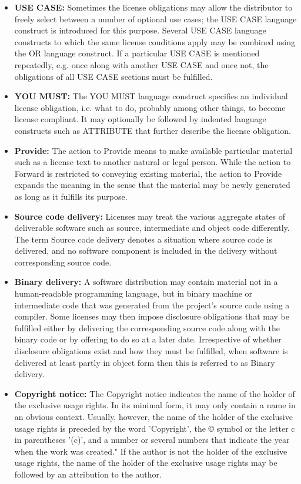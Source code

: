 \begin{itemize}
	\item \textbf{USE CASE:} Sometimes the license obligations may allow the distributor to freely select between a number of optional use cases; the USE CASE language construct is introduced for this purpose. Several USE CASE language constructs to which the same license conditions apply may be combined using the OR language construct. If a particular USE CASE is mentioned repeatedly, e.g. once along with another USE CASE and once not, the obligations of all USE CASE sections must be fulfilled.
	\item \textbf{YOU MUST:} The YOU MUST language construct specifies an individual license obligation, i.e. what to do, probably among other things, to become license compliant. It may optionally be followed by indented language constructs such as ATTRIBUTE that further describe the license obligation.
	\item \textbf{Provide:} The action to Provide means to make available particular material such as a license text to another natural or legal person. While the action to Forward is restricted to conveying existing material, the action to Provide expands the meaning in the sense that the material may be newly generated as long as it fulfills its purpose.
	\item \textbf{Source code delivery:} Licenses may treat the various aggregate states of deliverable software such as source, intermediate and object code differently. The term Source code delivery denotes a situation where source code is delivered, and no software component is included in the delivery without corresponding source code.
	\item \textbf{Binary delivery:} A software distribution may contain material not in a human-readable programming language, but in binary machine or intermediate code that was generated from the project's source code using a compiler. Some licenses may then impose disclosure obligations that may be fulfilled either by delivering the corresponding source code along with the binary code or by offering to do so at a later date. Irrespective of whether disclosure obligations exist and how they must be fulfilled, when software is delivered at least partly in object form then this is referred to as Binary delivery.
	\item \textbf{Copyright notice:} The Copyright notice indicates the name of the holder of the exclusive usage rights. In its minimal form, it may only contain a name in an obvious context. Usually, however, the name of the holder of the exclusive usage rights is preceded by the word 'Copyright', the © symbol or the letter c in parentheses '(c)', and a number or several numbers that indicate the year when the work was created." If the author is not the holder of the exclusive usage rights, the name of the holder of the exclusive usage rights may be followed by an attribution to the author.

\end{itemize}
